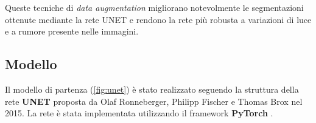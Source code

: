 Queste tecniche di \textit{data augmentation} migliorano notevolmente le segmentazioni ottenute mediante la rete UNET e rendono la rete più robusta a variazioni di luce e a rumore presente nelle immagini.


\subsection{Modello}

Il modello di partenza (\autoref{fig:unet}) è stato realizzato seguendo la struttura della rete \textbf{UNET} \cite{ronneberger2015unet} proposta da Olaf Ronneberger, Philipp Fischer e Thomas Brox nel 2015. La rete è stata implementata utilizzando il framework \textbf{PyTorch} \cite{pytorch}.



